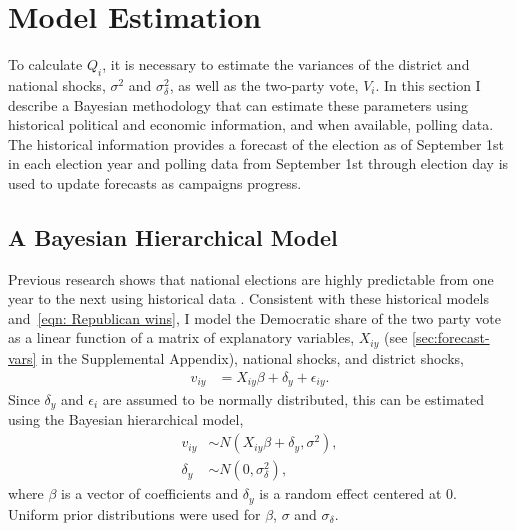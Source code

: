 \documentclass[12pt,final,fleqn]{article}
\theoremstyle{plain}
\begin{document}
\section{Model Estimation} \label{sec:model-estimation}
To calculate $Q_i$, it is necessary to estimate the variances of the district and national shocks, $\sigma^2$ and $\sigma^2_\delta$, as well as the two-party vote, $V_i$. In this section I describe a Bayesian methodology that can estimate these parameters using historical political and economic information, and when available, polling data. The historical information provides a forecast of the election as of September 1st in each election year and polling data from September 1st through election day is used to update forecasts as campaigns progress. 

\subsection{A Bayesian Hierarchical Model}
Previous research shows that national elections are highly predictable from one year to the next using historical data \citep[e.g.,][]{campbell1992forecasting, gelman1993american, kastellec2008predicting}. Consistent with these historical models and~\autoref{eqn: Republican wins}, I model the Democratic share of the two party vote as a linear function of a matrix of explanatory variables, $X_{iy}$ (see \autoref*{sec:forecast-vars} in the Supplemental Appendix), national shocks, and district shocks,
\begin{align}
v_{iy}&= X_{iy}\beta + \delta_y + \epsilon_{iy}.
\end{align}
Since $\delta_y$ and $\epsilon_i$ are assumed to be normally distributed, this can be estimated using the Bayesian hierarchical model,
\begin{align}
v_{iy} &\sim N\left(X_{iy}\beta + \delta_y,  \sigma^2\right), \label{eqn: hierarchical linear model} \\
\delta_y &\sim N(0, \sigma^2_\delta), \label{eqn: hierarchical linear model time effects}
\end{align}
where $\beta$ is a vector of coefficients and $\delta_y$ is a random effect centered at 0. Uniform prior distributions were used for $\beta$, $\sigma$ and $\sigma_\delta$.
\end{document}

